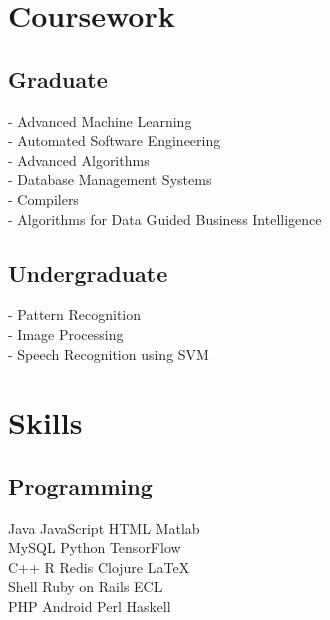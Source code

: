 \documentclass[]{bigfatnoob-resume}
\begin{document}
\begin{minipage}[t]{0.33\textwidth}

\section{Coursework}
\subsection{Graduate}
- Advanced Machine Learning \\
- Automated Software Engineering \\
- Advanced Algorithms \\
- Database Management Systems \\
- Compilers \\
- Algorithms for Data Guided Business Intelligence\\


\sectionsep

\subsection{Undergraduate}
- Pattern Recognition \\
- Image Processing \\
- Speech Recognition using SVM\\
\sectionsep


\section{Skills}
\subsection{Programming}
Java \textbullet{} JavaScript\textbullet{} HTML \textbullet{} Matlab \\
MySQL \textbullet{} Python \textbullet{} TensorFlow \\ 
C++ \textbullet{} R \textbullet{} Redis \textbullet{} Clojure \textbullet{} \LaTeX\ \\ 
\textbullet{} Shell \textbullet{} Ruby on Rails \textbullet{} ECL\\
PHP \textbullet{} Android \textbullet{} Perl \textbullet{} Haskell
\sectionsep


\end{minipage}
\end{document}
